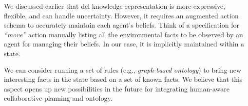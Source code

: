 {We discussed earlier that \acrshort{del} knowledge representation is more expressive, flexible, and can handle uncertainty. However, it requires an augmented action schema to accurately maintain each agent's beliefs.
Think of a specification for \textit{``move''} action manually listing all the environmental facts to be observed by an agent for managing their beliefs. In our case, it is implicitly maintained within a state.

We can consider running a set of rules (e.g., \textit{graph-based ontology}) to bring new interesting facts in the state based on a set of known facts. We believe that this aspect opens up new possibilities in the future for integrating human-aware collaborative planning and ontology.



}
